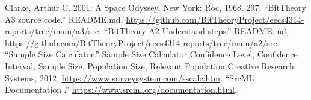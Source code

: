 \documentclass[12pt, dvipsnames, a4paper]{article}
\begin{document}
\begin{thebibliography}{00}
	 Clarke, Arthur C. 2001: A Space Odyssey. New York: Roc, 1968. 297.
	 “BitTheory A3 source code.” README.md, \href{https://github.com/BitTheoryProject/eecs4314-reports/tree/main/a3/src}{https://github.com/BitTheoryProject/eecs4314-reports/tree/main/a3/src}.
	 “BitTheory A2 Understand steps.” README.md, \href{https://github.com/BitTheoryProject/eecs4314-reports/tree/main/a2/src}{https://github.com/BitTheoryProject/eecs4314-reports/tree/main/a2/src}.
	 “Sample Size Calculator.” Sample Size Calculator \- Confidence Level, Confidence Interval, Sample Size, Population Size, Relevant Population \- Creative Research Systems, 2012, \href{https://www.surveysystem.com/sscalc.htm}{https://www.surveysystem.com/sscalc.htm}.
	 “SrcML Documentation .” \href{https://www.srcml.org/documentation.html}{https://www.srcml.org/documentation.html}.
\end{thebibliography}
\end{document}
